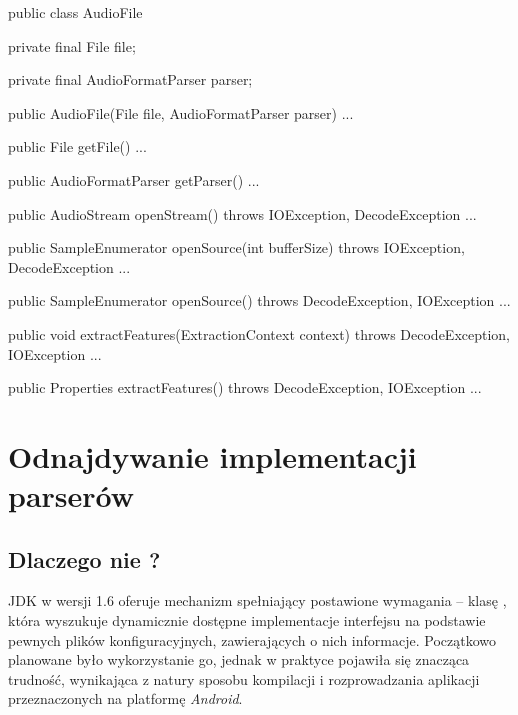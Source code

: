 \begin{java}
public class AudioFile {

    private final File file;

    private final AudioFormatParser parser;

    public AudioFile(File file, AudioFormatParser parser) { ... }

    public File getFile() { ... }

    public AudioFormatParser getParser() { ... }

    public AudioStream openStream() throws IOException, DecodeException { ... }

    public SampleEnumerator openSource(int bufferSize) throws IOException, DecodeException { ... }

    public SampleEnumerator openSource() throws DecodeException, IOException { ... }

    public void extractFeatures(ExtractionContext context) throws DecodeException, 
            IOException { ...}

    public Properties extractFeatures() throws DecodeException, IOException { ... }

}
\end{java}


\section{Odnajdywanie implementacji parserów}
\label{sec:odnajdywanie_implementacji}

\subsection{Dlaczego nie ?}
\label{sec:dlaczego_nie_service_loader}

JDK w wersji 1.6 oferuje mechanizm spełniający postawione wymagania -- klasę ,
która wyszukuje dynamicznie dostępne implementacje interfejsu na podstawie pewnych plików
konfiguracyjnych, zawierających o nich informacje. Początkowo planowane było wykorzystanie go,
jednak w praktyce pojawiła się znacząca trudność, wynikająca z natury sposobu kompilacji i
rozprowadzania aplikacji przeznaczonych na platformę \emph{Android}.

